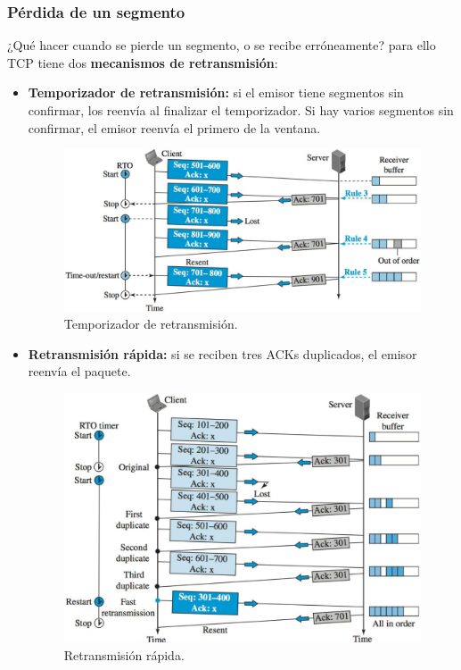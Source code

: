 \subsubsection{Pérdida de un segmento}
¿Qué hacer cuando se pierde un segmento, o se recibe erróneamente? para ello TCP tiene dos \textbf{mecanismos de retransmisión}:
\begin{itemize}
    \item \textbf{Temporizador de retransmisión:} si el emisor tiene segmentos sin confirmar, los reenvía al finalizar el temporizador. Si hay varios segmentos sin confirmar, el emisor reenvía el primero de la ventana.
        \begin{figure}[H]\centering
        \includegraphics[width=\textwidth]{img/TCPTdRet.png}
        \caption{Temporizador de retransmisión.}\end{figure}
    \item \textbf{Retransmisión rápida:} si se reciben tres ACKs duplicados, el emisor reenvía el paquete.
        \begin{figure}[H] \centering
        \includegraphics[width=\textwidth]{img/TCPRetRap.png}
        \caption{Retransmisión rápida.}\end{figure}
\end{itemize}
\newpage
